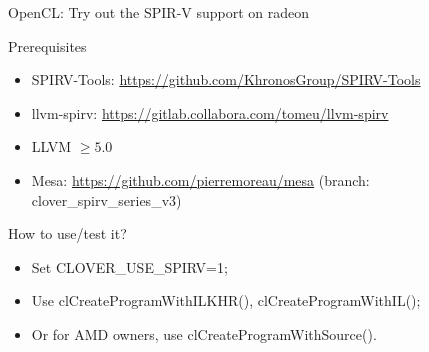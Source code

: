 \documentclass[11pt,english,compress]{beamer}
\begin{document}

\begin{frame}{OpenCL: Try out the SPIR-V support on radeon}
	\begin{block}{Prerequisites}
		\begin{itemize}
			\item SPIRV-Tools:
				\url{https://github.com/KhronosGroup/SPIRV-Tools}
			\item llvm-spirv:
				\url{https://gitlab.collabora.com/tomeu/llvm-spirv}
			\item LLVM $\geq 5.0$
			\item Mesa: \url{https://github.com/pierremoreau/mesa}
				(branch: clover\_spirv\_series\_v3)
		\end{itemize}
	\end{block}
	\begin{block}{How to use/test it?}
		\begin{itemize}
			\item Set CLOVER\_USE\_SPIRV=1;
			\item Use clCreateProgramWithILKHR(), clCreateProgramWithIL();
			\item Or for AMD owners, use clCreateProgramWithSource().
		\end{itemize}
	\end{block}
\end{frame}
\end{document}
